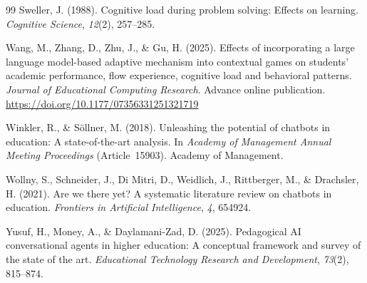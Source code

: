 \documentclass[11pt,a4paper]{article}
\begin{document}
\begin{thebibliography}{99}
Sweller, J. (1988). Cognitive load during problem solving: Effects on learning. \textit{Cognitive Science}, \textit{12}(2), 257--285.

Wang, M., Zhang, D., Zhu, J., \& Gu, H. (2025). Effects of incorporating a large language model-based adaptive mechanism into contextual games on students' academic performance, flow experience, cognitive load and behavioral patterns. \textit{Journal of Educational Computing Research}. Advance online publication. \url{https://doi.org/10.1177/07356331251321719}

Winkler, R., \& S\"{o}llner, M. (2018). Unleashing the potential of chatbots in education: A state-of-the-art analysis. In \textit{Academy of Management Annual Meeting Proceedings} (Article~15903). Academy of Management.

Wollny, S., Schneider, J., Di Mitri, D., Weidlich, J., Rittberger, M., \& Drachsler, H. (2021). Are we there yet? A systematic literature review on chatbots in education. \textit{Frontiers in Artificial Intelligence}, \textit{4}, 654924.

Yusuf, H., Money, A., \& Daylamani-Zad, D. (2025). Pedagogical AI conversational agents in higher education: A conceptual framework and survey of the state of the art. \textit{Educational Technology Research and Development}, \textit{73}(2), 815--874.

\end{thebibliography}
\end{document}
